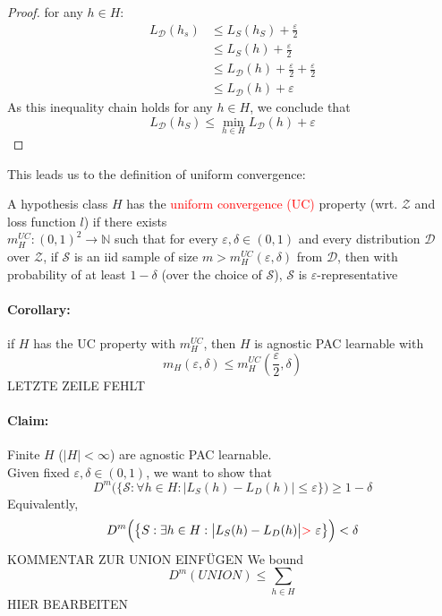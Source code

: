 \documentclass[10pt,a4paper]{article}
\theoremstyle{definition}
\theoremstyle{plain}
\begin{document}
\begin{proof}
for \colorbox{Apricot}{any} $h \in H$:
\begin{align*}
	L_\mathcal{D}(h_s) &\leq L_S(h_S) + \frac{\varepsilon}{2}  \tag{by def. $\varepsilon$-representativeness}\\
	&\leq L_S(h) + \frac{\varepsilon}{2} \tag{as $h_S$ is ERM-hyp.}\\
	&\leq L_\mathcal{D}(h) + \frac{\varepsilon}{2} + \frac{\varepsilon}{2} \tag{by def. $\varepsilon$-representativeness}\\
	&\leq  L_\mathcal{D}(h) + \varepsilon
\end{align*}
As this inequality chain holds for any $h \in H$, we conclude that $$L_\mathcal{D}(h_S) \leq \min_{h \in H} L_\mathcal{D}(h) + \varepsilon$$
\end{proof}
This leads us to the definition of uniform convergence:
\begin{boxeddef}
	A hypothesis class $H$ has the \textcolor{red}{uniform convergence (UC)} property (wrt. $\mathcal{Z}$ and loss function $l$) if there exists\\
	 $m_H^{UC}: (0,1)^2 \rightarrow \mathbb{N}$ such that for every $\varepsilon, \delta \in (0,1)$ and every distribution $\mathcal{D}$ over $\mathcal{Z}$, if $\mathcal{S}$ is an iid sample of size $m > m_H^{UC}(\varepsilon, \delta)$ from $\mathcal{D}$, then with probability of at least $1-\delta$ (over the choice of $\mathcal{S}$), $\mathcal{S}$ is $\varepsilon$-representative
\end{boxeddef}
\paragraph{Corollary:} if $H$ has the UC property with $m_H^{UC}$, then $H$ is agnostic PAC learnable with 
$$
	m_H(\varepsilon, \delta) \leq m_H^{UC}(\frac{\varepsilon}{2}, \delta)
$$
\colorbox{Apricot}{LETZTE ZEILE FEHLT}

\paragraph{Claim:} Finite $H$ ($|H|< \infty$) are agnostic PAC learnable.\\
Given fixed $\varepsilon, \delta \in (0,1)$, we want to show that
$$
	D^{m}\Big(\big\{\mathcal{S}: \forall h \in H: \left|L_S(h) - L_D(h) \right| \leq \varepsilon\big\}\Big) \geq 1-\delta
$$
Equivalently, 
$$
	D^{m}\Big(\big\{S: \exists h\in H: \big|L_S(h)-L_D(h)\big|\textcolor{red}{>}\ \varepsilon \big\}\Big) < \delta
$$
KOMMENTAR ZUR UNION EINFÜGEN
We bound
$$
	D^{m} (UNION) \leq \sum_{h \in H} 
$$
HIER BEARBEITEN\\
\end{document}
